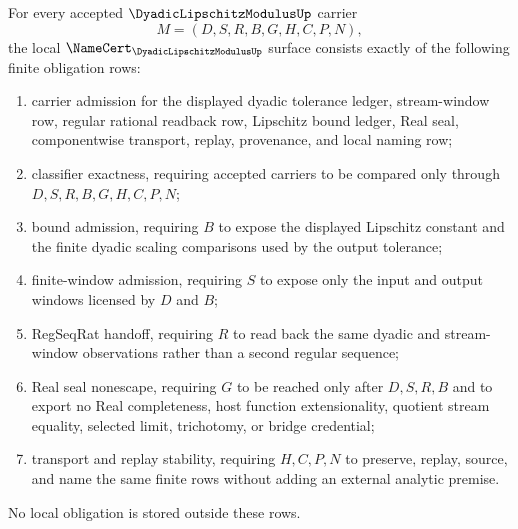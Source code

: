 \begin{theorem}
\label{thm:dyadic-lipschitz-modulus-namecert-obligations}
For every accepted $\DyadicLipschitzModulusUp$ carrier
$$
M=(D,S,R,B,G,H,C,P,N),
$$
the local $\NameCert_{\DyadicLipschitzModulusUp}$ surface consists exactly of the following finite obligation rows:
\begin{enumerate}
\item carrier admission for the displayed dyadic tolerance ledger, stream-window row, regular rational readback row, Lipschitz bound ledger, Real seal, componentwise transport, replay, provenance, and local naming row;
\item classifier exactness, requiring accepted carriers to be compared only through $D,S,R,B,G,H,C,P,N$;
\item bound admission, requiring $B$ to expose the displayed Lipschitz constant and the finite dyadic scaling comparisons used by the output tolerance;
\item finite-window admission, requiring $S$ to expose only the input and output windows licensed by $D$ and $B$;
\item RegSeqRat handoff, requiring $R$ to read back the same dyadic and stream-window observations rather than a second regular sequence;
\item Real seal nonescape, requiring $G$ to be reached only after $D,S,R,B$ and to export no Real completeness, host function extensionality, quotient stream equality, selected limit, trichotomy, or bridge credential;
\item transport and replay stability, requiring $H,C,P,N$ to preserve, replay, source, and name the same finite rows without adding an external analytic premise.
\end{enumerate}
No local obligation is stored outside these rows.
\end{theorem}
